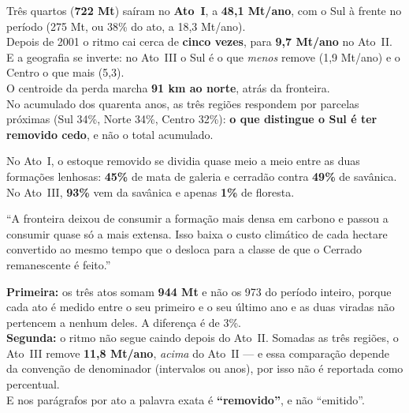 \begin{ancora}
Três quartos (\textbf{722 Mt}) saíram no \textbf{Ato~I}, a \textbf{48,1 Mt/ano},
com o Sul à frente no período (275 Mt, ou 38\% do ato, a 18,3 Mt/ano). \\
Depois de 2001 o ritmo cai cerca de \textbf{cinco vezes}, para \textbf{9,7
Mt/ano} no Ato~II. \\
E a geografia se inverte: no Ato~III o Sul é o que \emph{menos} remove (1,9
Mt/ano) e o Centro o que mais (5,3). \\
O centroide da perda marcha \textbf{91 km ao norte}, atrás da fronteira. \\[4pt]
No acumulado dos quarenta anos, as três regiões respondem por parcelas próximas
(Sul 34\%, Norte 34\%, Centro 32\%): \textbf{o que distingue o Sul é ter
removido cedo}, e não o total acumulado.
\end{ancora}

\begin{ancora}
No Ato~I, o estoque removido se dividia quase meio a meio entre as duas
formações lenhosas: \textbf{45\%} de mata de galeria e cerradão contra
\textbf{49\%} de savânica. \\
No Ato~III, \textbf{93\%} vem da savânica e apenas \textbf{1\%} de floresta.
\end{ancora}

\begin{nabanca}
``A fronteira deixou de consumir a formação mais densa em carbono e passou a
consumir quase só a mais extensa. Isso baixa o custo climático de cada hectare
convertido ao mesmo tempo que o desloca para a classe de que o Cerrado
remanescente é feito.''
\end{nabanca}

\begin{armadilha}
\textbf{Primeira:} os três atos somam \textbf{944 Mt} e não os 973 do período
inteiro, porque cada ato é medido entre o seu primeiro e o seu último ano e as
duas viradas não pertencem a nenhum deles. A diferença é de 3\%. \\[4pt]
\textbf{Segunda:} o ritmo não segue caindo depois do Ato~II. Somadas as três
regiões, o Ato~III remove \textbf{11,8 Mt/ano}, \emph{acima} do Ato~II --- e
essa comparação depende da convenção de denominador (intervalos ou anos), por
isso não é reportada como percentual. \\[4pt]
E nos parágrafos por ato a palavra exata é \textbf{``removido''}, e não
``emitido''.
\end{armadilha}

